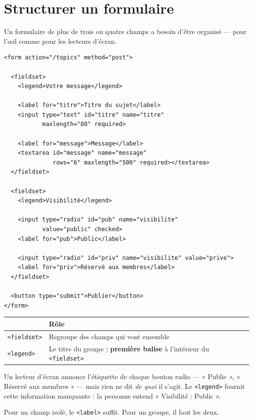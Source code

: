 \documentclass[a4paper,11pt]{article}
\newcommand{\hdr}[1]{\multicolumn{1}{l}{\color{white}\bfseries #1}}
\renewcommand{\arraystretch}{1.3}
\begin{document}
\section{Structurer un formulaire}

Un formulaire de plus de trois ou quatre champs a besoin d'être organisé --- pour l'\oe il comme pour les lecteurs d'écran.

\begin{lstlisting}[language=HTML5, caption={Regrouper des champs liés}]
<form action="/topics" method="post">

  <fieldset>
    <legend>Votre message</legend>

    <label for="titre">Titre du sujet</label>
    <input type="text" id="titre" name="titre"
           maxlength="80" required>

    <label for="message">Message</label>
    <textarea id="message" name="message"
              rows="6" maxlength="500" required></textarea>
  </fieldset>

  <fieldset>
    <legend>Visibilité</legend>

    <input type="radio" id="pub" name="visibilite"
           value="public" checked>
    <label for="pub">Public</label>

    <input type="radio" id="priv" name="visibilite" value="prive">
    <label for="priv">Réservé aux membres</label>
  </fieldset>

  <button type="submit">Publier</button>
</form>
\end{lstlisting}

\begin{center}
\renewcommand{\arraystretch}{1.0}
\begin{tabularx}{\linewidth}{p{2.4cm}X}
  \toprule
  \rowcolor{uniNavy}
  \hdr{Balise} & \hdr{Rôle} \\
  \midrule
  \rowcolor{uniPaper}
  \texttt{<fieldset>} & Regroupe des champs qui vont ensemble \\
  \texttt{<legend>} & Le titre du groupe ; \textbf{première balise} à l'intérieur du \texttt{<fieldset>} \\
  \bottomrule
\end{tabularx}
\end{center}

\begin{tcolorbox}[astuce, title={\texttt{<fieldset>} est indispensable pour un groupe de boutons radio}]
Un lecteur d'écran annonce l'étiquette de chaque bouton radio --- « Public », « Réservé aux membres » --- mais rien ne dit \textit{de quoi} il s'agit. Le \texttt{<legend>} fournit cette information manquante : la personne entend « Visibilité : Public ».

\vspace{3pt}
Pour un champ isolé, le \texttt{<label>} suffit. Pour un groupe, il faut les deux.
\end{tcolorbox}
\end{document}
